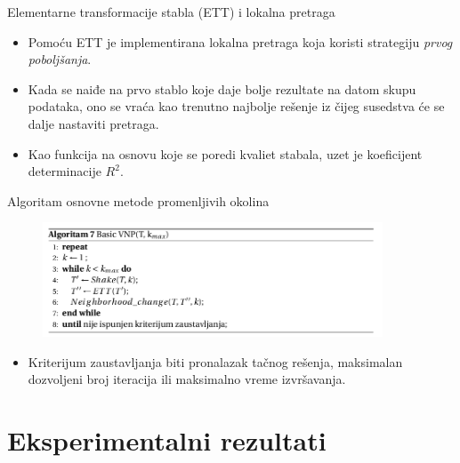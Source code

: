 \documentclass{beamer}
\begin{document}
\begin{frame}{Elementarne transformacije stabla (ETT) i lokalna pretraga}
\begin{itemize}
    \item Pomoću ETT je implementirana lokalna pretraga koja koristi strategiju \textit{prvog poboljšanja}.
    \item Kada se naiđe na prvo stablo koje daje bolje rezultate na datom skupu podataka, ono se vraća kao trenutno najbolje rešenje iz čijeg susedstva će se dalje nastaviti pretraga.
    \item Kao funkcija na osnovu koje se poredi kvaliet stabala, uzet je koeficijent determinacije $R^{2}$. 
\end{itemize}
\end{frame}

\begin{frame}{Algoritam osnovne metode promenljivih okolina}
\begin{figure}[!ht]
\begin{center}
\includegraphics[width=0.9\textwidth]{images/vnp_alg.png}
\end{center}
\end{figure}
\begin{itemize}
    \item Kriterijum zaustavljanja biti pronalazak tačnog rešenja, maksimalan dozvoljeni broj iteracija ili maksimalno vreme izvršavanja.
\end{itemize}
\end{frame}

\section{Eksperimentalni rezultati}
\end{document}
